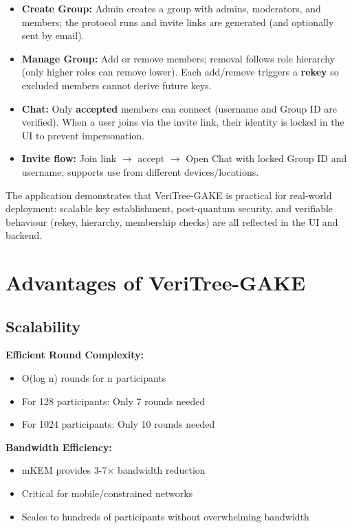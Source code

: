 \documentclass[12pt,a4paper]{report}
\begin{document}
\begin{itemize}
\item \textbf{Create Group:} Admin creates a group with admins, moderators, and members; the protocol runs and invite links are generated (and optionally sent by email).
\item \textbf{Manage Group:} Add or remove members; removal follows role hierarchy (only higher roles can remove lower). Each add/remove triggers a \textbf{rekey} so excluded members cannot derive future keys.
\item \textbf{Chat:} Only \textbf{accepted} members can connect (username and Group ID are verified). When a user joins via the invite link, their identity is locked in the UI to prevent impersonation.
\item \textbf{Invite flow:} Join link $\to$ accept $\to$ Open Chat with locked Group ID and username; supports use from different devices/locations.
\end{itemize}

The application demonstrates that VeriTree-GAKE is practical for real-world deployment: scalable key establishment, post-quantum security, and verifiable behaviour (rekey, hierarchy, membership checks) are all reflected in the UI and backend.

\section{Advantages of VeriTree-GAKE}

\subsection{Scalability}

\textbf{Efficient Round Complexity:}
\begin{itemize}
\item O(log n) rounds for n participants
\item For 128 participants: Only 7 rounds needed
\item For 1024 participants: Only 10 rounds needed
\end{itemize}

\textbf{Bandwidth Efficiency:}
\begin{itemize}
\item mKEM provides 3-7× bandwidth reduction
\item Critical for mobile/constrained networks
\item Scales to hundreds of participants without overwhelming bandwidth
\end{itemize}
\end{document}
